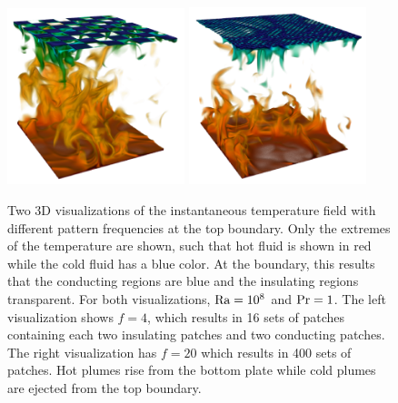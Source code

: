 \begin{figure}
\centering%
\includegraphics[width=0.46\textwidth]{fig11a.pdf}
\qquad
\includegraphics[width=0.46\textwidth]{fig11b.pdf}
\caption{%
Two 3D visualizations of the instantaneous temperature field with
different pattern frequencies at the top boundary.
Only the extremes of the temperature are shown, such that
hot fluid is shown in red while
the cold fluid has a blue color. At the boundary, this results that the
conducting regions are blue and the insulating regions transparent.
For both visualizations,
$\text{Ra}=10^8$ and $\text{Pr}=1$. The left visualization shows $f=4$, which
results in 16 sets of patches containing each two insulating patches and
two conducting patches. The right visualization has $f=20$ which results
in 400 sets of patches. Hot plumes rise from the bottom plate while cold
plumes are ejected from the top boundary.}
\label{figure13}
\end{figure}

